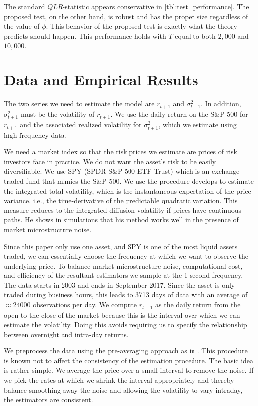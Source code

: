 \documentclass[11pt, letterpaper, twoside]{article}
\begin{document}
The standard $QLR$-statistic appears conservative in \cref{tbl:test_performance}. The proposed test, on the other hand, is robust and has the proper size regardless of the value of $\phi$. This behavior of the proposed test is exactly what the theory predicts should happen. This performance holds with $T$ equal to both $2,000$ and $10,000$. 

\section{Data and Empirical Results}\label{sec:empirical}

The two series we need to estimate the model are $r_{t+1}$ and $\sigma^2_{t+1}$. In addition, $\sigma^2_{t+1}$ must be the volatility of $r_{t+1}$.  We use the daily return on the S\&P 500 for $r_{t+1}$ and the associated realized volatility for $\sigma^2_{t+1}$, which we estimate using high-frequency data.

We need a market index so that the risk prices we estimate are prices of risk investors face in practice. We do not want the asset's risk to be easily diversifiable. We use SPY (SPDR S\&P 500 ETF Trust) which is an exchange-traded fund that mimics the S\&P 500.  We use the procedure \textcite{sangrey2018jumps} develops to estimate the integrated total volatility, which is the instantaneous expectation of the price variance, i.e., the time-derivative of the predictable quadratic variation. This measure reduces to the integrated diffusion volatility if prices have continuous paths. He shows in simulations that his method works well in the presence of market microstructure noise.

Since this paper only use one asset, and SPY is one of the most liquid assets traded, we can essentially choose the frequency at which we want to observe the underlying price. To balance market-microstructure noise, computational cost, and efficiency of the resultant estimators we sample at the \num{1} second frequency. The data starts in 2003 and ends in September 2017. Since the asset is only traded during business hours, this leads to \num{3713} days of data with an average of $\approx \num{24000}$ observations per day. We compute $r_{t+1}$ as the daily return from the open to the close of the market because this is the interval over which we can estimate the volatility. Doing this avoids requiring us to specify the relationship between overnight and intra-day returns. 

We preprocess the data using the pre-averaging approach as in \textcites{podolskij2009bipower, aitsahalia2012testing}. This procedure is known not to affect the consistency of the estimation procedure. The basic idea is rather simple. We average the price over a small interval to remove the noise. If we pick the rates at which we shrink the interval appropriately and thereby balance smoothing away the noise and allowing the volatility to vary intraday, the estimators are consistent.
\end{document}
